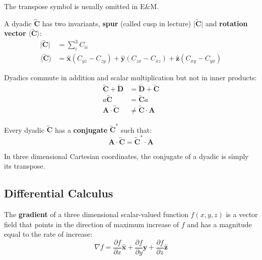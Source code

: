 \documentclass{article}
\begin{document}
The transpose symbol is usually omitted in E\&M.

A dyadic \(\mathbf{\overleftrightarrow{C}} \) has two invariants, \textbf{spur} (called cusp in lecture) \(\lvert\overleftrightarrow{\mathbf{C}} \rvert\) and \textbf{rotation vector} \(\langle\overleftrightarrow{\mathbf{C}}  \rangle\):
\begin{align*}
    \lvert\overleftrightarrow{\mathbf{C}} \rvert &= \sum_i^3 C_{ii}\\
    \langle\overleftrightarrow{\mathbf{C}} \rangle &= \mathbf{\hat{x}} (C_{yz}-C_{zy})+\mathbf{\hat{y}} (C_{zx}-C_{xz})+\mathbf{\hat{z}} (C_{xy}-C_{yx})
\end{align*}

Dyadics commute in addition and scalar multiplication but not in inner products:
\begin{align*}
    \overleftrightarrow{\mathbf{C}}+\overleftrightarrow{\mathbf{D} }&=\overleftrightarrow{\mathbf{D} }+\overleftrightarrow{\mathbf{C} } \\
    a \overleftrightarrow{\mathbf{C} }&=\overleftrightarrow{\mathbf{C} }a \\
    \mathbf{A} \cdot \overleftrightarrow{\mathbf{C} }&\neq \overleftrightarrow{\mathbf{C} }\cdot \mathbf{A} 
\end{align*}

\begin{definition}
    Every dyadic \(\overleftrightarrow{\mathbf{C} }\) has a \textbf{conjugate} \(\overleftrightarrow{\mathbf{C} }^*\) such that:
    \[
        \mathbf{A} \cdot \overleftrightarrow{\mathbf{C} }=\overleftrightarrow{\mathbf{C} }^*\cdot \mathbf{A} 
    \]  
\end{definition}

In three dimensional Cartesian coordinates, the conjugate of a dyadic is simply its transpose.

\subsection{Differential Calculus}
\begin{definition}
    The \textbf{gradient} of a three dimensional scalar-valued function \(f(x,y,z)\) is a vector field that points in the direction of maximum increase of \(f\) and has a magnitude equal to the rate of increase:
    \[
        \nabla f=\frac{\partial f}{\partial x}\mathbf{\hat{x}} +\frac{\partial f}{\partial y}\mathbf{\hat{y}} +\frac{\partial f}{\partial z}\mathbf{\hat{z}} 
    \]   
\end{definition}
\end{document}
